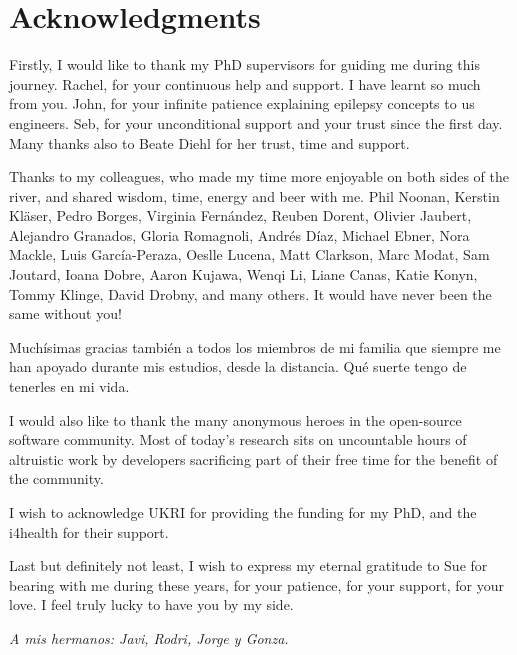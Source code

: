 \chapter{Acknowledgments}

Firstly, I would like to thank my PhD supervisors for guiding me during this journey.
Rachel, for your continuous help and support.
I have learnt so much from you.
John, for your infinite patience explaining epilepsy concepts to us engineers.
Seb, for your unconditional support and your trust since the first day.
Many thanks also to Beate Diehl for her trust, time and support.

Thanks to my colleagues, who made my time more enjoyable on both sides of the river, and shared wisdom, time, energy and beer with me.
Phil Noonan, Kerstin Kläser, Pedro Borges, Virginia Fernández, Reuben Dorent, Olivier Jaubert, Alejandro Granados, Gloria Romagnoli, Andrés Díaz, Michael Ebner, Nora Mackle, Luis García-Peraza, Oeslle Lucena, Matt Clarkson, Marc Modat, Sam Joutard, Ioana Dobre, Aaron Kujawa, Wenqi Li, Liane Canas, Katie Konyn, Tommy Klinge, David Drobny, and many others. It would have never been the same without you!

Muchísimas gracias también a todos los miembros de mi familia que siempre me han apoyado durante mis estudios, desde la distancia.
Qué suerte tengo de tenerles en mi vida.

I would also like to thank the many anonymous heroes in the open-source software community.
Most of today's research sits on uncountable hours of altruistic work by developers sacrificing part of their free time for the benefit of the community.

I wish to acknowledge \ac{UKRI} for providing the funding for my PhD, and the \ac{i4health} for their support.

Last but definitely not least, I wish to express my eternal gratitude to Sue for bearing with me during these years, for your patience, for your support, for your love.
I feel truly lucky to have you by my side.

\clearpage
\begin{center}
    \thispagestyle{empty}
    \raggedleft
    \vspace*{\fill}
    \textit{A mis hermanos: Javi, Rodri, Jorge y Gonza.}
    \vspace*{\fill}
\end{center}
\clearpage
